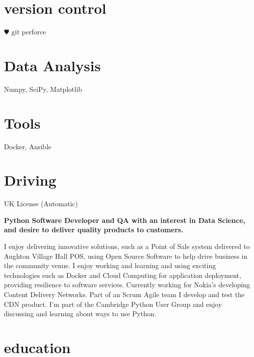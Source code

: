 \documentclass[]{cv-style}          %
\begin{document}
\begin{aside}
\section{version control}
{\color{red} $\varheartsuit$} git perforce
\section{Data Analysis}
Numpy, SciPy, Matplotlib
\section{Tools}
Docker, Ansible
\section{Driving}UK License (Automatic)
\end{aside}
\textbf{Python Software Developer and QA with an interest in Data Science, and desire to deliver quality products to customers.}\par
I enjoy delivering  innovative solutions, such as a Point of Sale system delivered to Aughton Village Hall POS, using Open Source Software to help drive business in the community venue.
I enjoy working and learning and using exciting technologies such as Docker and Cloud Computing for application deployment, providing resilience to software services.
Currently working for Nokia's developing Content Delivery Networks. Part of an Scrum Agile team I develop and test the CDN product.
I'm part of the Cambridge Python User Group and enjoy discussing and learning about ways to use Python.


\section{education}
\end{document}
